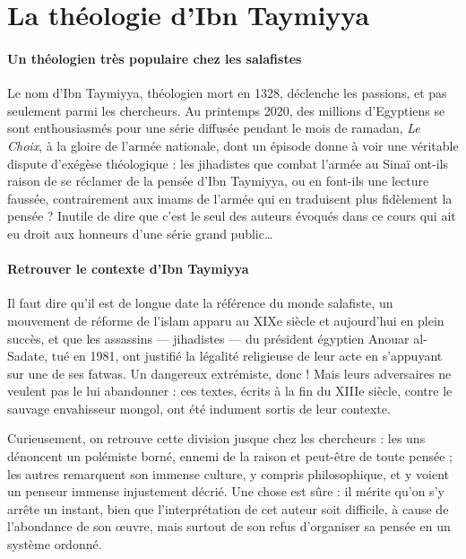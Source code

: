 \hypertarget{la-thuxe9ologie-dibn-taymiyya}{%
\section{La théologie d'Ibn
Taymiyya}\label{la-thuxe9ologie-dibn-taymiyya}}

\paragraph{Un théologien très populaire chez les salafistes}Le nom d'Ibn Taymiyya, théologien mort en 1328, déclenche les passions,
et pas seulement parmi les chercheurs. Au printemps 2020, des millions
d'Egyptiens se sont enthousiasmés pour une série diffusée pendant le
mois de ramadan, \emph{Le Choix}, à la gloire de l'armée nationale, dont
un épisode donne à voir une véritable dispute d'exégèse théologique :
les jihadistes que combat l'armée au Sinaï ont-ils raison de se réclamer
de la pensée d'Ibn Taymiyya, ou en font-ils une lecture faussée,
contrairement aux imams de l'armée qui en traduisent plus fidèlement la
pensée ? Inutile de dire que c'est le seul des auteurs évoqués dans ce
cours qui ait eu droit aux honneurs d'une série grand public\ldots{}

\paragraph{Retrouver le contexte d'Ibn Taymiyya}Il faut dire qu'il est de longue date la référence du monde salafiste,
un mouvement de réforme de l'islam apparu au XIXe siècle et aujourd'hui
en plein succès, et que les assassins --- jihadistes --- du président
égyptien Anouar al-Sadate, tué en 1981, ont justifié la légalité
religieuse de leur acte en s'appuyant sur une de ses fatwas. Un
dangereux extrémiste, donc ! Mais leurs adversaires ne veulent pas le
lui abandonner : ces textes, écrits à la fin du XIIIe siècle, contre le
sauvage envahisseur mongol, ont été indument sortis de leur contexte.

Curieusement, on retrouve cette division jusque chez les chercheurs :
les uns dénoncent un polémiste borné, ennemi de la raison et peut-être
de toute pensée ; les autres remarquent son immense culture, y compris
philosophique, et y voient un penseur immense injustement décrié. Une
chose est sûre : il mérite qu'on s'y arrête un instant, bien que
l'interprétation de cet auteur soit difficile, à cause de l'abondance de
son œuvre, mais surtout de son refus d'organiser sa pensée en un système
ordonné.

